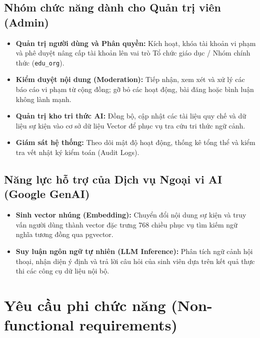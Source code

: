 \subsection{Nhóm chức năng dành cho Quản trị viên (Admin)}

\begin{itemize}
    \item \textbf{Quản trị người dùng và Phân quyền:} Kích hoạt, khóa tài khoản vi phạm và phê duyệt nâng cấp tài khoản lên vai trò Tổ chức giáo dục / Nhóm chính thức (\texttt{edu\_org}).

    \item \textbf{Kiểm duyệt nội dung (Moderation):} Tiếp nhận, xem xét và xử lý các báo cáo vi phạm từ cộng đồng; gỡ bỏ các hoạt động, bài đăng hoặc bình luận không lành mạnh.
    
    \item \textbf{Quản trị kho tri thức AI:} Đồng bộ, cập nhật các tài liệu quy chế và dữ liệu sự kiện vào cơ sở dữ liệu Vector để phục vụ tra cứu tri thức ngữ cảnh.
    
    \item \textbf{Giám sát hệ thống:} Theo dõi mật độ hoạt động, thống kê tổng thể và kiểm tra vết nhật ký kiểm toán (Audit Logs).
\end{itemize}

\subsection{Năng lực hỗ trợ của Dịch vụ Ngoại vi AI (Google GenAI)}

\begin{itemize}
    \item \textbf{Sinh vector nhúng (Embedding):} Chuyển đổi nội dung sự kiện và truy vấn người dùng thành vector đặc trưng 768 chiều phục vụ tìm kiếm ngữ nghĩa tương đồng qua pgvector.

    \item \textbf{Suy luận ngôn ngữ tự nhiên (LLM Inference):} Phân tích ngữ cảnh hội thoại, nhận diện ý định và trả lời câu hỏi của sinh viên dựa trên kết quả thực thi các công cụ dữ liệu nội bộ.
\end{itemize}

\section{Yêu cầu phi chức năng (Non-functional requirements)}

